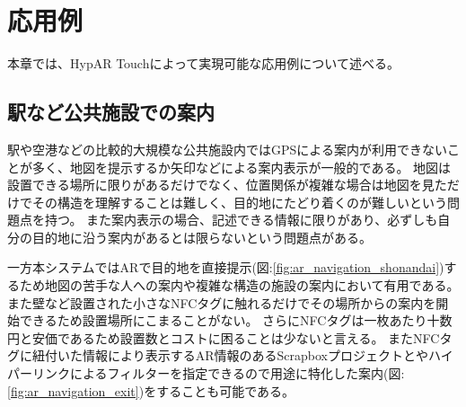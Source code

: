 \chapter{応用例}
\label{chap:usage}

本章では、HypAR Touchによって実現可能な応用例について述べる。

\newpage


\section{駅など公共施設での案内}
駅や空港などの比較的大規模な公共施設内ではGPSによる案内が利用できないことが多く、地図を提示するか矢印などによる案内表示が一般的である。
地図は設置できる場所に限りがあるだけでなく、位置関係が複雑な場合は地図を見ただけでその構造を理解することは難しく、目的地にたどり着くのが難しいという問題点を持つ。
また案内表示の場合、記述できる情報に限りがあり、必ずしも自分の目的地に沿う案内があるとは限らないという問題点がある。

一方本システムではARで目的地を直接提示(図:\ref{fig:ar_navigation_shonandai})するため地図の苦手な人への案内や複雑な構造の施設の案内において有用である。
また壁など設置された小さなNFCタグに触れるだけでその場所からの案内を開始できるため設置場所にこまることがない。
さらにNFCタグは一枚あたり十数円と安価であるため設置数とコストに困ることは少ないと言える。
またNFCタグに紐付いた情報により表示するAR情報のあるScrapboxプロジェクトとやハイパーリンクによるフィルターを指定できるので用途に特化した案内(図:\ref{fig:ar_navigation_exit})をすることも可能である。

